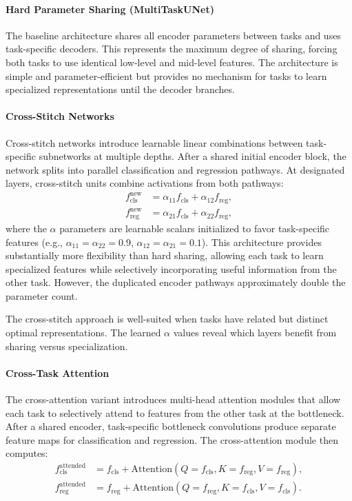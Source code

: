\paragraph{Hard Parameter Sharing (MultiTaskUNet)}

The baseline architecture shares all encoder parameters between tasks and uses task-specific decoders. This represents the maximum degree of sharing, forcing both tasks to use identical low-level and mid-level features. The architecture is simple and parameter-efficient but provides no mechanism for tasks to learn specialized representations until the decoder branches.

\paragraph{Cross-Stitch Networks}

Cross-stitch networks \cite{misra_cross-stitch_2016} introduce learnable linear combinations between task-specific subnetworks at multiple depths. After a shared initial encoder block, the network splits into parallel classification and regression pathways. At designated layers, cross-stitch units combine activations from both pathways:
\begin{align}
f_{\text{cls}}^{\text{new}} &= \alpha_{11} f_{\text{cls}} + \alpha_{12} f_{\text{reg}}, \\
f_{\text{reg}}^{\text{new}} &= \alpha_{21} f_{\text{cls}} + \alpha_{22} f_{\text{reg}},
\end{align}
where the $\alpha$ parameters are learnable scalars initialized to favor task-specific features (e.g., $\alpha_{11} = \alpha_{22} = 0.9$, $\alpha_{12} = \alpha_{21} = 0.1$). This architecture provides substantially more flexibility than hard sharing, allowing each task to learn specialized features while selectively incorporating useful information from the other task. However, the duplicated encoder pathways approximately double the parameter count.

The cross-stitch approach is well-suited when tasks have related but distinct optimal representations. The learned $\alpha$ values reveal which layers benefit from sharing versus specialization.

\paragraph{Cross-Task Attention}

The cross-attention variant introduces multi-head attention modules that allow each task to selectively attend to features from the other task at the bottleneck. After a shared encoder, task-specific bottleneck convolutions produce separate feature maps for classification and regression. The cross-attention module then computes:
\begin{align}
f_{\text{cls}}^{\text{attended}} &= f_{\text{cls}} + \text{Attention}(Q=f_{\text{cls}}, K=f_{\text{reg}}, V=f_{\text{reg}}), \\
f_{\text{reg}}^{\text{attended}} &= f_{\text{reg}} + \text{Attention}(Q=f_{\text{reg}}, K=f_{\text{cls}}, V=f_{\text{cls}}).
\end{align}


